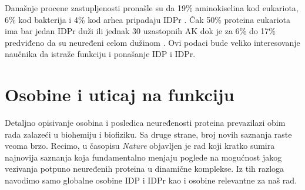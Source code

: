 Današnje procene zastupljenosti pronašle su da 19\% aminokiselina kod
eukariota, 6\% kod bakterija i 4\% kod arhea pripadaju
IDPr \parencite{Peng2014}.  Čak 50\% proteina eukariota ima bar jedan IDPr duži
ili jednak 30 uzastopnih AK \parencite{Xue2012} dok je za 6\% do 17\%
predviđeno da su neuređeni celom dužinom \parencite{Tompa2002}.  Ovi podaci bude
veliko interesovanje naučnika da istraže funkciju i ponašanje IDP i IDPr.

\section {Osobine i uticaj na funkciju}

Detaljno opisivanje osobina i posledica neuređenosti proteina prevazilazi obim
rada zalazeći u biohemiju i biofiziku. Sa druge strane, broj novih saznanja
raste veoma brzo. Recimo, u časopisu \textit{Nature} objavljen je rad
\parencite{rebecca2018} koji kratko sumira najnovija saznanja koja
fundamentalno menjaju poglede na mogućnost jakog vezivanja potpuno neuređenih
proteina u dinamične komplekse.  Iz tih razloga navodimo samo globalne osobine
IDP i IDPr kao i osobine relevantne za naš rad.

